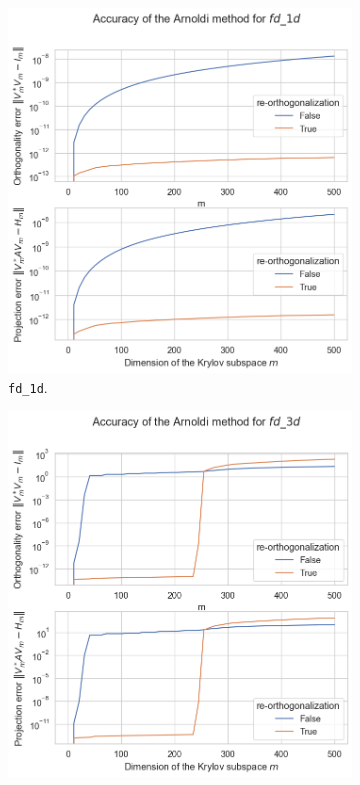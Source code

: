 \begin{figure}[h!]
    \centering
    \begin{subfigure}[b]{0.45\textwidth}
        \includegraphics[width=\textwidth]{img/arnoldi/fd_1d.png}
        \caption{\texttt{fd\_1d}.}
    \end{subfigure}
    \hfill
    \begin{subfigure}[b]{0.45\textwidth}
        \includegraphics[width=\textwidth]{img/arnoldi/fd_3d.png}

\end{subfigure}
\end{figure}
